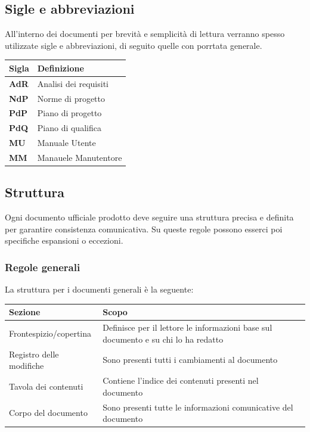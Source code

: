 \subsection{Sigle e abbreviazioni}

All'interno dei documenti per brevità e semplicità di lettura verranno spesso utilizzate sigle e abbreviazioni, di seguito quelle con porrtata generale.

\begin{center}
    \begin{tabularx}{\linewidth}{l | X }            
        \textbf{Sigla} & \textbf{Definizione}\\
        \hline
        \textbf{AdR} & Analisi dei requisiti\\
        \textbf{NdP}& Norme di progetto\\
        \textbf{PdP}& Piano di progetto\\
        \textbf{PdQ}& Piano di qualifica\\
        \textbf{MU}& Manuale Utente\\
        \textbf{MM}& Manauele Manutentore\\
    \end{tabularx}
\end{center}

\subsection{Struttura}

Ogni documento ufficiale prodotto deve seguire una struttura precisa e definita per garantire consistenza comunicativa. Su queste regole possono esserci poi specifiche espansioni o eccezioni.

\subsubsection{Regole generali}

La struttura per i documenti generali è la seguente:

\begin{center}
    \begin{tabularx}{\linewidth}{l | X }            
        \textbf{Sezione} & \textbf{Scopo}\\
        \hline
        Frontespizio/copertina & Definisce per il lettore le informazioni base sul documento e su chi lo ha redatto\\
        Registro delle modifiche & Sono presenti tutti i cambiamenti al documento\\
        Tavola dei contenuti & Contiene l'indice dei contenuti presenti nel documento \\
        Corpo del documento & Sono presenti tutte le informazioni comunicative del documento\\
    \end{tabularx}
\end{center}

